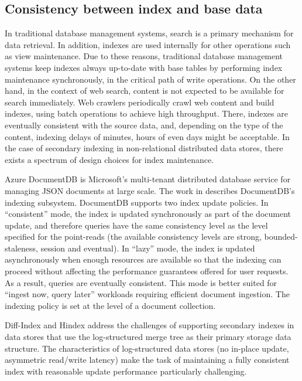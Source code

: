 \subsection{Consistency between index and base data}

In traditional database management systems, search is a primary mechanism for data retrieval.
In addition, indexes are used internally for other operations such as view maintenance.
Due to these reasons, traditional database management systems keep indexes always up-to-date with base tables by performing
index maintenance synchronously, in the critical path of write operations.
On the other hand, in the context of web search, content is not expected to be available for search immediately.
Web crawlers periodically crawl web content and build indexes, using batch operations to achieve high throughput.
There, indexes are eventually consistent with the source data, and, depending on the type of the content,
indexing delays of minutes, hours of even days might be acceptable.
In the case of secondary indexing in non-relational distributed data stores,
there exists a spectrum of design choices for index maintenance.

\bigskip
\noindent

Azure DocumentDB is Microsoft’s multi-tenant distributed database service for managing JSON documents at large scale.
The work in \cite{shukla:schemaagnostic} describes DocumentDB's indexing subsystem.
DocumentDB supports two index update policies.
In ``consistent'' mode, the index is updated synchronously as part of the document update, and therefore
queries have the same consistency level as the level specified for the point-reads
(the available consistency levels are strong, bounded-staleness, session and eventual).
In ``lazy'' mode, the index is updated asynchronously when enough resources are available so that the indexing can proceed
without affecting the performance guarantees offered for user requests.
As a result, queries are eventually consistent.
This mode is better suited for ``ingest now, query later'' workloads requiring efficient document ingestion.
The indexing policy is set at the level of a document collection.

\bigskip
\noindent

Diff-Index \cite{tan:diffindex} and Hindex \cite{tang:deferredindexing} address the challenges of supporting secondary
indexes in data stores that use the log-structured merge tree as their primary storage data structure.
The characteristics of log-structured data stores (no in-place update, asymmetric read/write latency)
make the task of maintaining a fully consistent index with reasonable update performance particularly challenging.


